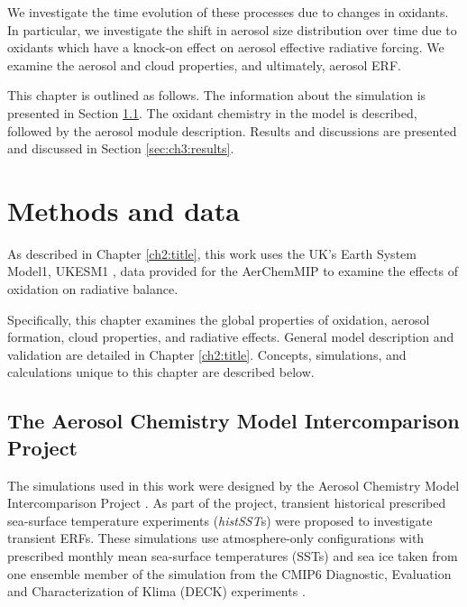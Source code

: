 We investigate the time evolution of these processes due to changes in oxidants. In particular, we investigate the shift in aerosol size distribution over time due to oxidants which have a knock-on effect on aerosol effective radiative forcing. We examine the aerosol and cloud properties, and ultimately, aerosol ERF. 


This chapter is outlined as follows. The information about the simulation is presented in Section \ref{sec:ch3:aerchemmip}. The oxidant chemistry in the model is described, followed by the aerosol module description. Results and discussions are presented and discussed in Section \ref{sec:ch3:results}.

\section{Methods and data}
\label{sec:ch3:methods}

As described in Chapter \ref{ch2:title}, this work uses the UK's Earth System Model1, UKESM1 \citep{sellarUKESM1DescriptionEvaluation2019}, data provided for the AerChemMIP \citep{collinsAerChemMIPQuantifyingEffects2017} to examine the effects of  oxidation on radiative balance. 

Specifically, this chapter examines the global properties of  oxidation, aerosol formation, cloud properties, and radiative effects. General model description and validation are detailed in Chapter \ref{ch2:title}. Concepts, simulations, and calculations unique to this chapter are described below. 

\subsection{The Aerosol Chemistry Model Intercomparison Project}
\label{sec:ch3:aerchemmip}


The simulations used in this work were designed by the Aerosol Chemistry Model Intercomparison Project \citep[AerChemMIP;][]{collinsAerChemMIPQuantifyingEffects2017}. As part of the project, transient historical prescribed sea-surface temperature experiments (\textit{histSST}s) were proposed to investigate transient ERFs. These simulations use atmosphere-only configurations with prescribed monthly mean sea-surface temperatures (SSTs) and sea ice taken from one ensemble member of the \hist{} simulation from the CMIP6 Diagnostic, Evaluation and Characterization of Klima (DECK) experiments \citep{eyringOverviewCoupledModel2016}. 


